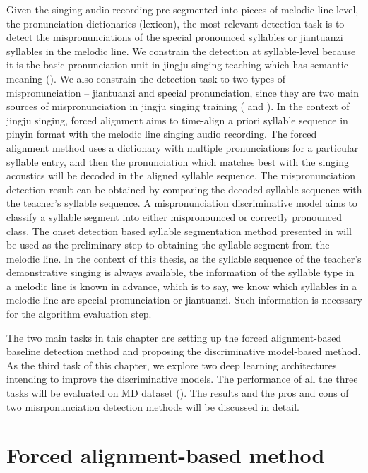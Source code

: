Given the singing audio recording pre-segmented into pieces of melodic line-level, the pronunciation dictionaries (lexicon), the most relevant detection task is to detect the mispronunciations of the special pronounced syllables or \gls{jiantuanzi} syllables in the melodic line. We constrain the detection at syllable-level because it is the basic pronunciation unit in jingju singing teaching which has semantic meaning (). We also constrain the detection task to two types of mispronunciation -- \gls{jiantuanzi} and special pronunciation, since they are two main sources of mispronunciation in jingju singing training ( and ). In the context of jingju singing, forced alignment aims to time-align a priori syllable sequence in pinyin format with the melodic line singing audio recording. The forced alignment method uses a dictionary with multiple pronunciations for a particular syllable entry, and then the pronunciation which matches best with the singing acoustics will be decoded in the aligned syllable sequence. The mispronunciation detection result can be obtained by comparing the decoded syllable sequence with the teacher's syllable sequence. A mispronunciation discriminative model aims to classify a syllable segment into either mispronounced or correctly pronounced class. The onset detection based syllable segmentation method presented in  will be used as the preliminary step to obtaining the syllable segment from the melodic line. In the context of this thesis, as the syllable sequence of the teacher's demonstrative singing is always available, the information of the syllable type in a melodic line is known in advance, which is to say, we know which syllables in a melodic line are special pronunciation or \gls{jiantuanzi}. Such information is necessary for the algorithm evaluation step.

The two main tasks in this chapter are setting up the forced alignment-based baseline detection method and proposing the discriminative model-based method. As the third task of this chapter, we explore two deep learning architectures intending to improve the discriminative models. The performance of all the three tasks will be evaluated on \gls{MD} dataset (). The results and the pros and cons of two misrponunciation detection methods will be discussed in detail.

\section{Forced alignment-based method}\label{sec:ch6:forced_alignment}

